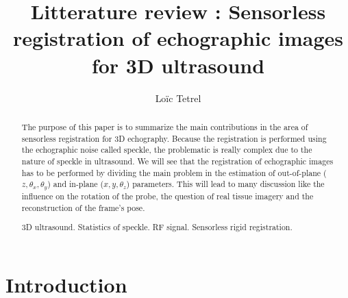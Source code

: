 \documentclass[runningheads,a4paper]{llncs}
\newcommand{\keywords}[1]{\par\addvspace\baselineskip
\noindent\keywordname\enspace\ignorespaces#1}
\begin{document}
\mainmatter  %

\title{Litterature review : Sensorless registration of echographic images for 3D ultrasound}


%
%
\author{Loïc Tetrel}


\maketitle

\begin{abstract}
The purpose of this paper is to summarize the main contributions in the area of sensorless registration for 3D echography. Because the registration is performed using the echographic noise called speckle, the problematic is really complex due to the nature of speckle in ultrasound. We will see that the registration of echographic images has to be performed by dividing the main problem in the estimation of out-of-plane ($z, \theta_x, \theta_y$) and in-plane ($x, y, \theta_z$) parameters. This will lead to many discussion like the influence on the rotation of the probe, the question of real tissue imagery and the reconstruction of the frame's  pose.
\keywords{3D ultrasound. Statistics of speckle. RF signal. Sensorless rigid registration.}
\end{abstract}

\section{Introduction}
\end{document}

